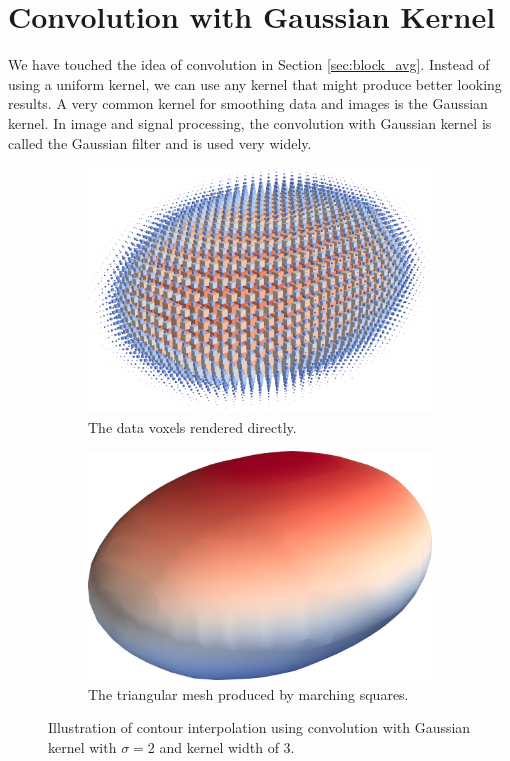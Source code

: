 \documentclass[a4paper,10pt]{report}
\begin{document}
\section{Convolution with Gaussian Kernel}

We have touched the idea of convolution in Section \ref{sec:block_avg}. Instead of using a uniform kernel, we can use any kernel that might produce better looking results. A very common kernel for smoothing data and images is the Gaussian kernel. In image and signal processing, the convolution with Gaussian kernel is called the Gaussian filter and is used very widely.
\begin{figure}[H]
    \centering
    \begin{subfigure}{.49\textwidth}
        \includegraphics[width=\textwidth]{../images/3D/Ellipsoid_blocks_gaussian.png}
    \caption{The data voxels rendered directly.}
    \label{fig:Ellipsoid_blocks_gaussian}
    \end{subfigure}
    \hfill
    \begin{subfigure}{.49\textwidth}
        \includegraphics[width=\textwidth]{../images/3D/Ellipsoid_marching_squares_gaussian.png}
    \caption{The triangular mesh produced by marching squares.}
    \label{fig:Ellipsoid_marching_squares_gaussian}
    \end{subfigure}
    \caption{Illustration of contour interpolation using convolution with Gaussian kernel with $\sigma=2$ and kernel width of 3.}
    \label{fig:Ellipsoid_gaussian}
\end{figure}
\end{document}
